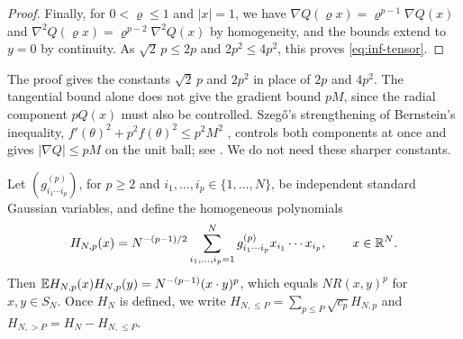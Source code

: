 \begin{proof}
Finally, for $0<\varrho\le1$ and $|x|=1$, we have $\nabla Q(\varrho x)=\varrho^{p-1}\nabla Q(x)$ and $\nabla^2Q(\varrho x)=\varrho^{p-2}\nabla^2Q(x)$ by homogeneity, and the bounds extend to $y=0$ by continuity. As $\sqrt2\,p\le2p$ and $2p^2\le4p^2$, this proves \eqref{eq:inf-tensor}.
\end{proof}

The proof gives the constants $\sqrt2\,p$ and $2p^2$ in place of $2p$ and $4p^2$. The tangential bound alone does not give the gradient bound $pM$, since the radial component $pQ(x)$ must also be controlled. Szeg\H{o}'s strengthening of Bernstein's inequality, $f'(\theta)^2+p^2f(\theta)^2\le p^2M^2$ \cite[Theorem~3.7]{QueffelecZarouf2019}, controls both components at once and gives $|\nabla Q|\le pM$ on the unit ball; see \cite[(32) and Theorem~4.3]{ChatzakouSarantopoulos2019}. We do not need these sharper constants.

Let $(g^{(p)}_{i_1\cdots i_p})$, for $p\ge2$ and $i_1,\dots,i_p\in\{1,\dots,N\}$, be independent standard Gaussian variables, and define the homogeneous polynomials
\begin{equation}\label{eq:inf-pure}
H_{N,p}(x)=N^{-(p-1)/2}\sum_{i_1,\dots,i_p=1}^Ng^{(p)}_{i_1\cdots i_p}x_{i_1}\cdots x_{i_p},\qquad x\in\mathbb R^N.
\end{equation}
Then $\mathbb E H_{N,p}(x)H_{N,p}(y)=N^{-(p-1)}(x\cdot y)^p$, which equals $NR(x,y)^p$ for $x,y\in S_N$. Once $H_N$ is defined, we write $H_{N,\le P}=\sum_{p\le P}\sqrt{c_p}H_{N,p}$ and $H_{N,>P}=H_N-H_{N,\le P}$.

